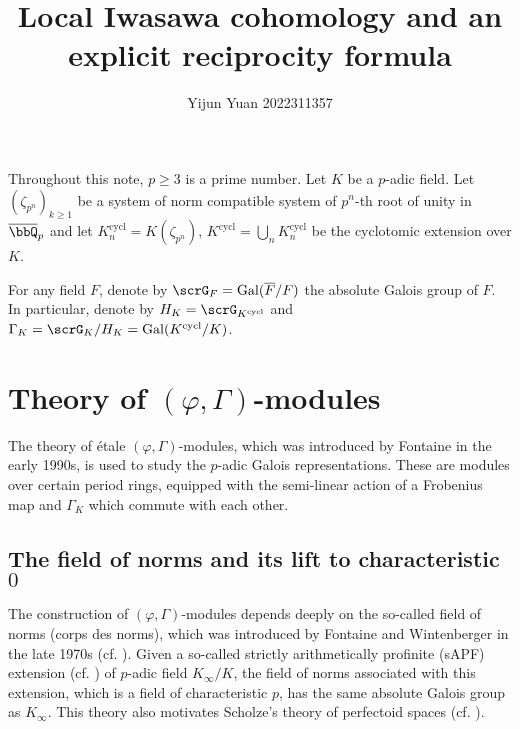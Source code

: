 \documentclass[a4paper,oneside]{amsart}
\title{Local Iwasawa cohomology and an explicit reciprocity formula}
\author{Yijun Yuan\textsuperscript{\orcidlink{0000-0001-6571-6980}} 2022311357}
\DeclareMathOperator{\Gal}{Gal}
\DeclareMathOperator{\cycl}{cycl}
\numberwithin{equation}{section}
\begin{document}
\maketitle
\tableofcontents
Throughout this note, $p\geq 3$ is a prime number. Let $K$ be a $p$-adic field. Let $(\zeta_{p^n})_{k\geq 1}$ be a system of norm compatible system of $p^n$-th root of unity in $\overline{\bbQ}_p$ and let $K_n^{\cycl}=K(\zeta_{p^n})$, $K^{\cycl}=\bigcup_n K_n^{\cycl}$ be the cyclotomic extension over $K$.

For any field $F$, denote by $\scrG_F=\Gal(\overline{F}/F)$ the absolute Galois group of $F$. In particular, denote by $H_K=\scrG_{K^{\cycl}}$ and $\Gamma_K=\scrG_K/H_K=\Gal(K^{\cycl}/K)$.
\section{Theory of $(\varphi,\Gamma)$-modules}
The theory of \'etale $(\varphi,\Gamma)$-modules, which was introduced by Fontaine in the early 1990s, is used to study the $p$-adic Galois representations. These are modules over certain period rings, equipped with the semi-linear action of a Frobenius map and $\Gamma_K$ which commute with each other.

\subsection{The field of norms and its lift to characteristic $0$}
The construction of $(\varphi,\Gamma)$-modules depends deeply on the so-called field of norms (corps des norms), which was introduced by Fontaine and Wintenberger in the late 1970s (cf. \cite{fontaine_extensions_1979,fontaine_corps_1979,wintenberger_corps_1983}). Given a so-called strictly arithmetically profinite (sAPF) extension (cf. \cite[D\'efinitions 1.2.1]{wintenberger_corps_1983}) of $p$-adic field $K_\infty/K$, the field of norms associated with this extension, which is a field of characteristic $p$, has the same absolute Galois group as $K_\infty$. This theory also motivates Scholze's theory of perfectoid spaces (cf. \cite[Theorem 1.1]{scholze_perfectoid_2012}).
\end{document}
